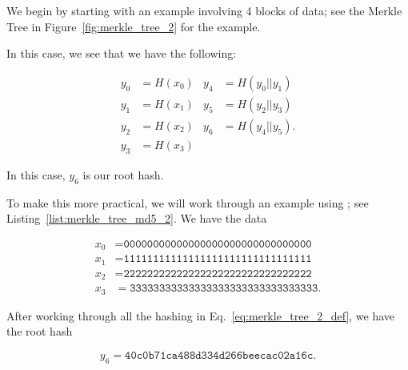 \begin{example}

We begin by starting with an example involving 4 blocks of data;
see the Merkle Tree in Figure~\ref{fig:merkle_tree_2}
for the example.



In this case, we see that we have the following:

\begin{align}
    y_{0} &= H(x_{0})
        &
    y_{4} &= H(y_{0}||y_{1}) \nonumber\\
    y_{1} &= H(x_{1})
        &
    y_{5} &= H(y_{2}||y_{3}) \nonumber\\
    y_{2} &= H(x_{2})
        &
    y_{6} &= H(y_{4}||y_{5}). \nonumber\\
    y_{3} &= H(x_{3})
    \label{eq:merkle_tree_2_def}
\end{align}

\noindent
In this case, $y_{6}$ is our root hash.

To make this more practical, we will work through an example
using \MDFive{}; see Listing~\ref{list:merkle_tree_md5_2}.
We have the data

\begin{align}
    x_{0} &= \texttt{00000000000000000000000000000000}
        \nonumber\\
    x_{1} &= \texttt{11111111111111111111111111111111}
        \nonumber\\
    x_{2} &= \texttt{22222222222222222222222222222222}
        \nonumber\\
    x_{3} &= \texttt{33333333333333333333333333333333}.
\end{align}



\noindent
After working through all the hashing in Eq.~\eqref{eq:merkle_tree_2_def},
we have the root hash

\begin{equation}
    y_{6} = \texttt{40c0b71ca488d334d266beecac02a16c}.
\end{equation}
\end{example}

